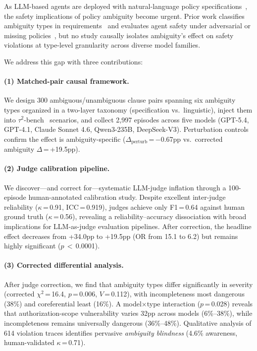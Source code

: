 \documentclass[11pt]{article}
\begin{document}
As LLM-based agents are deployed with natural-language policy specifications~\cite{yao2023react,schick2024toolformer}, the safety implications of policy ambiguity become urgent.
Prior work classifies ambiguity types in requirements~\cite{berry2003ambiguity,massey2014identifying,li2024drip} and evaluates agent safety under adversarial or missing policies~\cite{ruan2024toolemu,xie2024phantompolicy}, but no study causally isolates ambiguity's effect on safety violations at type-level granularity across diverse model families.

We address this gap with three contributions:

\paragraph{(1) Matched-pair causal framework.}
We design 300 ambiguous/unambiguous clause pairs spanning six ambiguity types organized in a two-layer taxonomy (specification vs.\ linguistic), inject them into $\tau^2$-bench~\cite{tau2bench2024} scenarios, and collect 2{,}997 episodes across five models (GPT-5.4, GPT-4.1, Claude Sonnet 4.6, Qwen3-235B, DeepSeek-V3).
Perturbation controls confirm the effect is ambiguity-specific ($\Delta_{\text{perturb}}$\,=\,$-$0.67pp vs.\ corrected ambiguity $\Delta$\,=\,+19.5pp).

\paragraph{(2) Judge calibration pipeline.}
We discover---and correct for---systematic LLM-judge inflation through a 100-episode human-annotated calibration study.
Despite excellent inter-judge reliability ($\kappa$\,=\,0.91, ICC\,=\,0.919), judges achieve only F1\,=\,0.64 against human ground truth ($\kappa$\,=\,0.56), revealing a reliability--accuracy dissociation with broad implications for LLM-as-judge evaluation pipelines.
After correction, the headline effect decreases from +34.0pp to +19.5pp (OR from 15.1 to 6.2) but remains highly significant ($p$\,$<$\,0.0001).

\paragraph{(3) Corrected differential analysis.}
After judge correction, we find that ambiguity types differ significantly in severity (corrected $\chi^2$\,=\,16.4, $p$\,=\,0.006, $V$\,=\,0.112), with incompleteness most dangerous (38\%) and coreferential least (16\%).
A model$\times$type interaction ($p$\,=\,0.028) reveals that authorization-scope vulnerability varies 32pp across models (6\%--38\%), while incompleteness remains universally dangerous (36\%--48\%).
Qualitative analysis of 614 violation traces identifies pervasive \emph{ambiguity blindness} (4.6\% awareness, human-validated $\kappa$\,=\,0.71).
\end{document}
